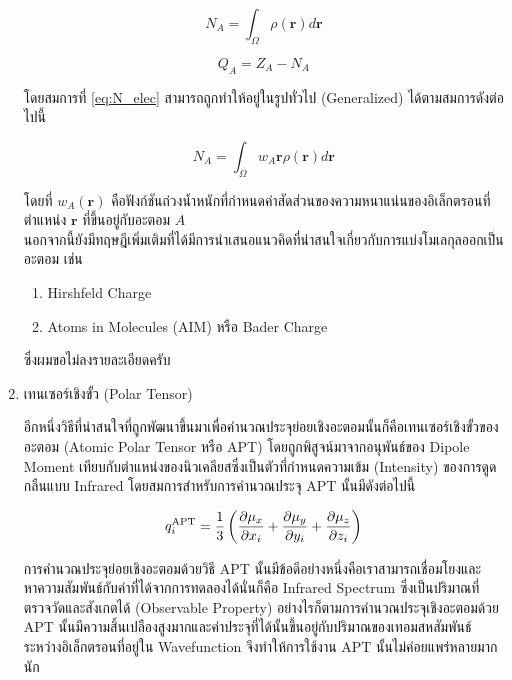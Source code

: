 \begin{enumerate}[topsep=0pt,noitemsep]
          \begin{equation}\label{eq:N_elec}
              N_{A} = \int_{\Omega} \rho(\bm{r}) d\bm{r}
          \end{equation}

          \begin{equation}
              Q_{A} = Z_{A} - N_{A}
          \end{equation}

          \noindent โดยสมการที่ \eqref{eq:N_elec} สามารถถูกทำให้อยู่ในรูปทั่วไป (Generalized) ได้ตามสมการดังต่อไปนี้

          \begin{equation}\label{eq:N_elec_general}
              N_{A} = \int_{\Omega} w_{A}\bm{r} \rho(\bm{r}) d\bm{r}
          \end{equation}

          \noindent โดยที่ $w_{A}(\bm{r})$ คือฟังก์ชันถ่วงน้ำหนักที่กำหนดค่าสัดส่วนของความหนาแน่นของอิเล็กตรอนที่ตำแหน่ง $\bm{r}$ ที่ขึ้นอยู่กับอะตอม $A$ \\

          นอกจากนี้ยังมีทฤษฎีเพิ่มเติมที่ได้มีการนำเสนอแนวคิดที่น่าสนใจเกี่ยวกับการแบ่งโมเลกุลออกเป็นอะตอม เช่น

          \begin{enumerate}[topsep=0pt,noitemsep]\setlength\itemsep{0.5em}
              \item Hirshfeld Charge\autocite{hirshfeld1977}

              \item Atoms in Molecules (AIM) หรือ Bader Charge\autocite{bader1985,bader1991}
          \end{enumerate}

          \noindent ซึ่งผมขอไม่ลงรายละเอียดครับ

    \item เทนเซอร์เชิงขั้ว (Polar Tensor)\autocite{person1974,milani2010}

          อีกหนึ่งวิธีที่น่าสนใจที่ถูกพัฒนาขึ้นมาเพื่อคำนวณประจุย่อยเชิงอะตอมนั้นก็คือเทนเซอร์เชิงขั้วของอะตอม (Atomic Polar Tensor หรือ APT) โดยถูกพิสูจน์มาจากอนุพันธ์ของ Dipole Moment เทียบกับตำแหน่งของนิวเคลียสซึ่งเป็นตัวที่กำหนดความเข้ม (Intensity) ของการดูดกลืนแบบ Infrared โดยสมการสำหรับการคำนวณประจุ APT นั้นมีดังต่อไปนี้

          \begin{equation}\label{eq:apt_chage}
              q^{\text{APT}}_{i} = \frac{1}{3} \left( \pdv{\mu_{x}}{x_{i}} + \pdv{\mu_{y}}{y_{i}}
              + \pdv{\mu_{z}}{z_{i}} \right)
          \end{equation}

          การคำนวณประจุย่อยเชิงอะตอมด้วยวิธี APT นั้นมีข้อดีอย่างหนึ่งคือเราสามารถเชื่อมโยงและหาความสัมพันธ์กับค่าที่ได้จากการทดลองได้นั่นก็คือ Infrared Spectrum ซึ่งเป็นปริมาณที่ตรวจวัดและสังเกตได้ (Observable Property) อย่างไรก็ตามการคำนวณประจุเชิงอะตอมด้วย APT นั้นมีความสิ้นเปลืองสูงมากและค่าประจุที่ได้นั้นขึ้นอยู่กับปริมาณของเทอมสหสัมพันธ์ระหว่างอิเล็กตรอนที่อยู่ใน Wavefunction จึงทำให้การใช้งาน APT นั้นไม่ค่อยแพร่หลายมากนัก

\end{enumerate}

